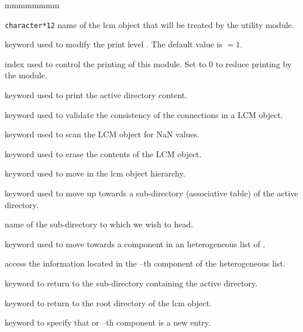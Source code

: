 \begin{ListeDeDescription}{mmmmmmmm}

\item[\dusa{NAME1}] {\tt character*12} name of the {\sc lcm} object that will be treated by the utility module.

\item[\moc{EDIT}] keyword used to modify the print level . The default value is  $=1$.

\item[\dusa{iprint}] index used to control the printing of this module. Set to 0 to
reduce printing by the module.

\item[\moc{DIR}] keyword used to print the active directory content.

\item[\moc{VAL}] keyword used to validate the consistency of the connections in a LCM object.

\item[\moc{NAN}] keyword used to scan the LCM object for NaN values.

\item[\moc{ERAS}] keyword used to erase the contents of the LCM object.

\item[\moc{STEP}] keyword used to move in the {\sc lcm} object hierarchy.

\item[\moc{UP}] keyword used to move up towards a sub-directory (associative table) of the
active directory.

\item[\dusa{NOMDIR}] name of the sub-directory to which we wish to head.

\item[\moc{AT}] keyword used to move towards a component in an heterogeneous list of .

\item[\dusa{index}] access the information located in the --th component of the heterogeneous list.

\item[\moc{DOWN}] keyword to return to the sub-directory containing
the active directory.

\item[\moc{ROOT}] keyword to return to the root directory of the {\sc lcm} object.

\item[\moc{NEW}] keyword to specify that  or --th component is a new entry.


\end{ListeDeDescription}
